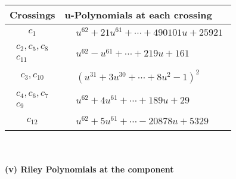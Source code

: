 \documentclass[1p]{elsarticle_modified}
\theoremstyle{definition}
\begin{document}
\begin{tabular}{m{50pt}|m{274pt}}
Crossings & \hspace{64pt}u-Polynomials at each crossing \\
\hline $$\begin{aligned}c_{1}\end{aligned}$$&$\begin{aligned}
&u^{62}+21 u^{61}+\cdots+490101 u+25921
\end{aligned}$\\
\hline $$\begin{aligned}c_{2},c_{5},c_{8}\\c_{11}\end{aligned}$$&$\begin{aligned}
&u^{62}- u^{61}+\cdots+219 u+161
\end{aligned}$\\
\hline $$\begin{aligned}c_{3},c_{10}\end{aligned}$$&$\begin{aligned}
&(u^{31}+3 u^{30}+\cdots+8 u^2-1)^{2}
\end{aligned}$\\
\hline $$\begin{aligned}c_{4},c_{6},c_{7}\\c_{9}\end{aligned}$$&$\begin{aligned}
&u^{62}+4 u^{61}+\cdots+189 u+29
\end{aligned}$\\
\hline $$\begin{aligned}c_{12}\end{aligned}$$&$\begin{aligned}
&u^{62}+5 u^{61}+\cdots-20878 u+5329
\end{aligned}$\\
\hline
\end{tabular}\\~\\
\newpage\renewcommand{\arraystretch}{1}
\flushleft \textbf{(v) Riley Polynomials at the component}\newline \\
\end{document}
